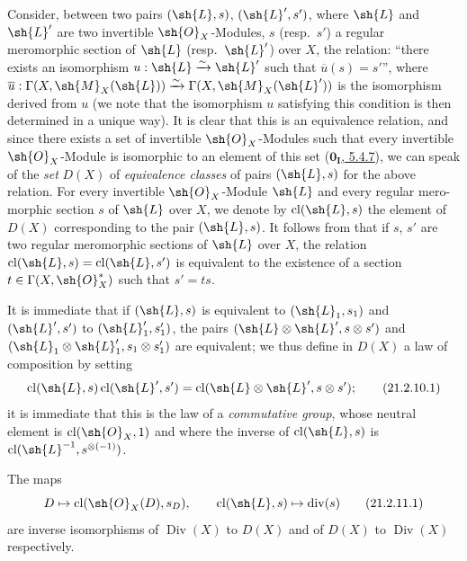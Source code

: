 \begin{env}[21.2.10]
\label{IV.21.2.10}
Consider, between two pairs $(\sh{L},s)$, $(\sh{L}',s')$, where $\sh{L}$ and $\sh{L}'$ are two invertible $\sh{O}_X$-Modules, $s$ (resp.\ $s'$) a regular meromorphic section of $\sh{L}$ (resp.\ $\sh{L}'$) over $X$, the relation:
``there exists an isomorphism $u:\sh{L}\xrightarrow{\sim}\sh{L}'$ such that $\overline{u}(s)=s'$'',
where $\overline{u}:\Gamma(X,\sh{M}_X(\sh{L}))\xrightarrow{\sim}\Gamma(X,\sh{M}_X(\sh{L}'))$ is the isomorphism derived from $u$ (we note that the isomorphism $u$ satisfying this condition is then determined in a unique way).
It is clear that this is an equivalence relation, and since there exists a set of invertible $\sh{O}_X$-Modules such that every invertible $\sh{O}_X$-Module is isomorphic to an element of this set (\hyperref[0.5.4.7]{$\mathbf{0_I}$, 5.4.7}), we can speak of the \emph{set} $D(X)$ of \emph{equivalence classes} of pairs $(\sh{L},s)$ for the above relation.
For every invertible $\sh{O}_X$-Module $\sh{L}$ and every regular mero-
morphic section $s$ of $\sh{L}$ over $X$, we denote by $\operatorname{cl}(\sh{L},s)$ the element of $D(X)$ corresponding to the pair $(\sh{L},s)$.
It follows from  that if $s$, $s'$ are two regular meromorphic sections of $\sh{L}$ over $X$, the relation $\operatorname{cl}(\sh{L},s)=\operatorname{cl}(\sh{L},s')$ is equivalent to the existence of a section $t\in\Gamma(X,\sh{O}_X^*)$ such that $s'=ts$.

It is immediate that if $(\sh{L},s)$ is equivalent to $(\sh{L}_1,s_1)$ and $(\sh{L}',s')$ to $(\sh{L}_1',s_1')$, the pairs $(\sh{L}\otimes\sh{L}',s\otimes s')$ and $(\sh{L}_1\otimes\sh{L}_1',s_1\otimes s_1')$ are equivalent;
we thus define in $D(X)$ a law of composition by setting
\[
\label{IV.21.2.10.1}
  \operatorname{cl}(\sh{L},s)\operatorname{cl}(\sh{L}',s')=\operatorname{cl}(\sh{L}\otimes\sh{L}',s\otimes s');
  \tag{21.2.10.1}
\]
it is immediate that this is the law of a \emph{commutative group}, whose neutral element is $\operatorname{cl}(\sh{O}_X,1)$ and where the inverse of $\operatorname{cl}(\sh{L},s)$ is $\operatorname{cl}(\sh{L}^{-1},s^{\otimes(-1)})$.
\end{env}

\begin{proposition}[21.2.11]
\label{IV.21.2.11}
The maps
\[
\label{IV.21.2.11.1}
  D\mapsto\operatorname{cl}(\sh{O}_X(D),s_D),\qquad \operatorname{cl}(\sh{L},s)\mapsto\operatorname{div}(s)
  \tag{21.2.11.1}
\]
are inverse isomorphisms of $\operatorname{Div}(X)$ to $D(X)$ and of $D(X)$ to $\operatorname{Div}(X)$ respectively.
\end{proposition}

